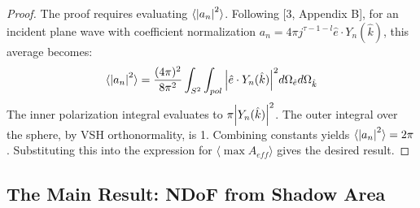 \documentclass[11pt,a4paper]{article}
\newcommand{\avg}[1]{\langle #1 \rangle} %
\begin{document}
\begin{proof}
The proof requires evaluating \(\avg{\abs{a_{n}}^{2}}\). Following [3, Appendix B], for an incident plane wave with coefficient normalization \(a_{n}=4\pi j^{\tau-1-l}\hat{e}\cdot Y_{n}(\hat{k})\), this average becomes:
\begin{equation}
    \avg{\abs{a_{n}}^{2}}=\frac{(4\pi)^{2}}{8\pi^{2}}\int_{S^{2}}\int_{pol}\abs{\hat{e}\cdot Y_{n}(\hat{k})}^{2}d\Omega_{\hat{e}}d\Omega_{\hat{k}}
\end{equation}
The inner polarization integral evaluates to \(\pi\abs{Y_{n}(\hat{k})}^{2}\). The outer integral over the sphere, by VSH orthonormality, is 1. Combining constants yields \(\avg{\abs{a_{n}}^{2}}=2\pi\). Substituting this into the expression for \(\avg{\max A_{eff}}\) gives the desired result.
\end{proof}

\subsection{The Main Result: NDoF from Shadow Area}
\end{document}
